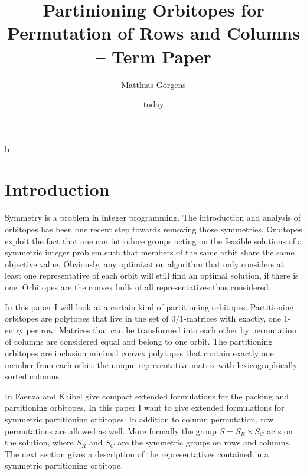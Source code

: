 b\documentclass[a4paper]{amsart}
\author{Matthias Görgens}
\theoremstyle{definition}
\newcommand\mpar[1]{\marginpar {\flushleft\sffamily\small #1}}
\newcommand{\todo}[1]{\mpar{#1}}
\begin{document}
\date{today}
\title{Partinioning Orbitopes for Permutation of Rows and Columns -- Term Paper}
\maketitle
\tableofcontents

\section{Introduction}
Symmetry is a problem in integer programming.  \todo{Why?} The
introduction and analysis of orbitopes has been one recent step
towards removing those symmetries.  Orbitopes exploit the fact that
one can introduce groups acting on the feasible solutions of a
symmetric integer problem such that members of the same orbit share
the same objective value.  Obviously, any optimization algorithm that
only considers at least one representative of each orbit will still
find an optimal solution, if there is one.  Orbitopes are the convex
hulls of all representatives thus considered.

In this paper I will look at a certain kind of partitioning orbitopes.
Partitioning orbitopes are polytopes that live in the set of
\(0/1\)-matrices with exactly, one \(1\)-entry per row.  Matrices that
can be transformed into each other by permutation of columns are
considered equal and belong to one orbit.  The partitioning orbitopes
are inclusion minimal convex polytopes that contain exactly one member
from each orbit: the unique representative matrix with
lexicographically sorted columns.

In \cite{faenza-2008} Faenza and Kaibel give compact extended
formulations for the packing and partitioning orbitopes.  In this
paper I want to give extended formulations for symmetric partitioning
orbitopes: In addition to column permutation, row permutations are
allowed as well.  More formally the group \(S = S_R \times S_C\) acts
on the solution, where \(S_R\) and \(S_C\) are the symmetric groups on
rows and columns.  The next section gives a description of the
representatives contained in a symmetric partitioning orbitope.

\end{document}
